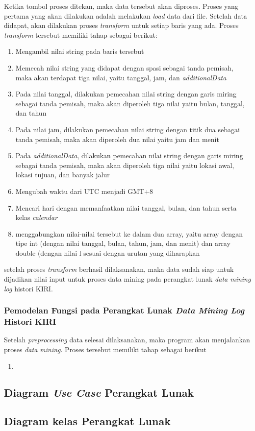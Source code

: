 Ketika tombol proses ditekan, maka data tersebut akan diproses. Proses yang pertama yang akan dilakukan adalah melakukan \textsl{load} data dari file. Setelah data didapat, akan dilakukan proses \textsl{transform} untuk setiap baris yang ada. Proses \textsl{transform} tersebut memiliki tahap sebagai berikut:
\begin{enumerate}
	\item Mengambil nilai string pada baris tersebut
	\item Memecah nilai string yang didapat dengan spasi sebagai tanda pemisah, maka akan terdapat tiga nilai, yaitu tanggal, jam, dan \textsl{additionalData}
	\item Pada nilai tanggal, dilakukan pemecahan nilai string dengan garis miring sebagai tanda pemisah, maka akan diperoleh tiga nilai yaitu bulan, tanggal, dan tahun
	\item Pada nilai jam, dilakukan pemecahan nilai string dengan titik dua sebagai tanda pemisah, maka akan diperoleh dua nilai yaitu jam dan menit
	\item Pada \textsl{additionalData}, dilakukan pemecahan nilai string dengan garis miring sebagai tanda pemisah, maka akan diperoleh tiga nilai yaitu lokasi awal, lokasi tujuan, dan banyak jalur
	\item Mengubah waktu dari UTC menjadi GMT+8
	\item Mencari hari dengan memanfaatkan nilai tanggal, bulan, dan tahun serta kelas \textsl{calendar}
	\item menggabungkan nilai-nilai tersebut ke dalam dua array, yaitu array dengan tipe int (dengan nilai tanggal, bulan, tahun, jam, dan menit) dan array double (dengan nilai l sesuai dengan urutan yang diharapkan
\end{enumerate}

setelah proses \textsl{transform} berhasil dilaksanakan, maka data sudah siap untuk dijadikan nilai input untuk proses data mining pada perangkat lunak \textsl{data mining log} histori KIRI.

\subsubsection{Pemodelan Fungsi pada Perangkat Lunak \textsl{Data Mining Log} Histori KIRI}
Setelah \textsl{preprocessing} data selesai dilaksanakan, maka program akan menjalankan proses \textsl{data mining}. Proses tersebut memiliki tahap sebagai berikut
\begin{enumerate}
	\item 
\end{enumerate}  

\subsection{Diagram \textsl{Use Case} Perangkat Lunak}
\subsection{Diagram kelas Perangkat Lunak}


















